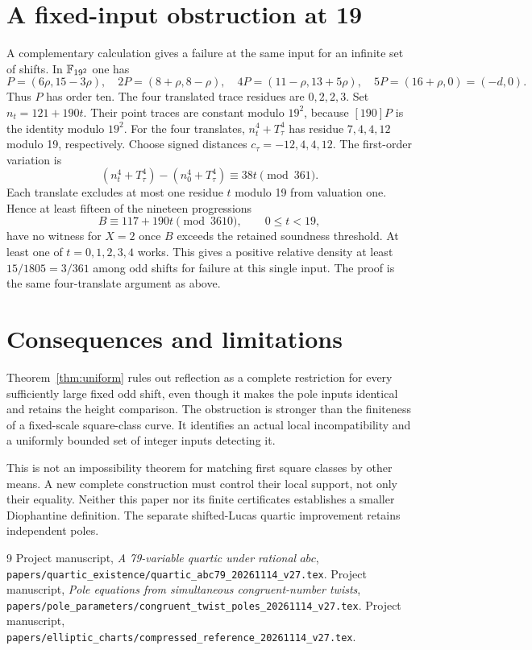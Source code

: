 \documentclass[11pt,a4paper]{article}
\begin{document}
\section{A fixed-input obstruction at 19}
A complementary calculation gives a failure at the same input for an
infinite set of shifts. In $\mathbb F_{19^2}$ one has
\[
 P=(6\rho,15-3\rho),\quad 2P=(8+\rho,8-\rho),\quad
 4P=(11-\rho,13+5\rho),\quad 5P=(16+\rho,0)=(-d,0).
\]
Thus $P$ has order ten. The four translated trace residues are $0,2,2,3$.
Set $n_t=121+190t$. Their point traces are constant modulo $19^2$,
because $[190]P$ is the identity modulo $19^2$. For the four translates,
$n_t^4+T_\tau^4$ has residue $7,4,4,12$ modulo 19, respectively.
Choose signed distances $c_\tau=-12,4,4,12$.
The first-order variation is
\[
 (n_t^4+T_\tau^4)-(n_0^4+T_\tau^4)\equiv38t\pmod {361}.
\]
Each translate excludes at most one residue $t$ modulo 19 from valuation
one. Hence at least fifteen of the nineteen progressions
\[
 B\equiv117+190t\pmod {3610},\qquad 0\le t<19,
\]
have no witness for $X=2$ once $B$ exceeds the retained soundness threshold.
At least one of $t=0,1,2,3,4$ works. This gives a positive relative density
at least $15/1805=3/361$ among odd shifts for failure at this single input.
The proof is the same four-translate argument as above.

\section{Consequences and limitations}
Theorem~\ref{thm:uniform} rules out reflection as a complete restriction
for every sufficiently large fixed odd shift, even though it makes the
pole inputs identical and retains the height comparison. The obstruction
is stronger than the finiteness of a fixed-scale square-class curve.
It identifies an actual local incompatibility and a uniformly bounded
set of integer inputs detecting it.

This is not an impossibility theorem for matching first square classes by
other means. A new complete construction must control their local support,
not only their equality. Neither this paper nor its finite certificates
establishes a smaller Diophantine definition. The separate shifted-Lucas
quartic improvement retains independent poles.

\begin{thebibliography}{9}
 Project manuscript,
\emph{A 79-variable quartic under rational $abc$},
\nolinkurl{papers/quartic_existence/quartic_abc79_20261114_v27.tex}.
 Project manuscript,
\emph{Pole equations from simultaneous congruent-number twists},
\nolinkurl{papers/pole_parameters/congruent_twist_poles_20261114_v27.tex}.
 Project manuscript,
\nolinkurl{papers/elliptic_charts/compressed_reference_20261114_v27.tex}.
\end{thebibliography}
\end{document}
